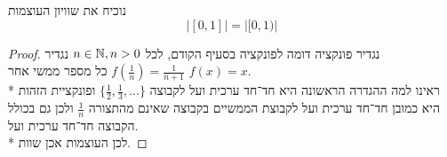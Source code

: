 \Subquestion{}
נוכיח את שוויון העוצמות
\[
	|[0, 1]| = |[0, 1)| %
\]
\begin{proof}
	נגדיר פונקציה דומה לפונקציה בסעיף הקודם, לכל $n \in \mathbb{N}, n > 0$ נגדיר $f(\frac{1}{n}) = \frac{1}{n + 1}$ כל מספר ממשי אחר $f(x) = x$. \\*
	ראינו למה ההגדרה הראשונה היא חד־חד ערכית ועל לקבוצה $\{ \frac{1}{2}, \frac{1}{3}, \hdots \}$ ופונקציית הזהות היא כמובן חד־חד ערכית ועל לקבוצת הממשיים בקבוצה שאינם מהתצורה $\frac{1}{n}$ ולכן גם בכולל הקבוצה חד־חד ערכית ועל. \\*
	לכן העוצמות אכן שוות.
\end{proof}

